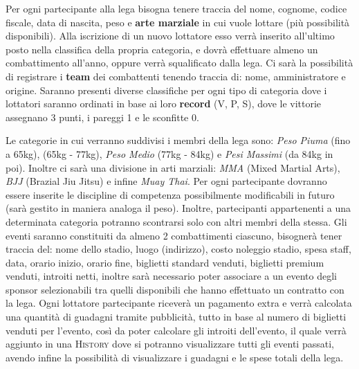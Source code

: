 \documentclass[a4paper,12pt]{report}
\begin{document}
Per ogni partecipante alla lega bisogna tenere traccia del nome, cognome, codice fiscale, data di nascita, peso e \textbf{arte 
marziale} in cui vuole lottare (più possibilità disponibili). Alla iscrizione di un nuovo lottatore esso verrà inserito all'ultimo 
posto nella classifica della propria categoria, e dovrà effettuare almeno un combattimento all'anno, oppure verrà  
squalificato dalla lega. Ci sarà la possibilità di registrare i \textbf{team} dei combattenti tenendo traccia di: nome, amministratore e 
origine. Saranno presenti diverse classifiche per ogni tipo di categoria dove i lottatori saranno ordinati 
in base ai loro \textbf{record} (V, P, S), dove le vittorie assegnano 3 punti, i pareggi 1 e le sconfitte 0.\par
Le categorie in cui verranno suddivisi i membri della lega sono: \textit{Peso Piuma} (fino a 65kg), \textit{} 
(65kg - 77kg), \textit{Peso Medio} (77kg - 84kg) e \textit{Pesi Massimi} (da 84kg in poi). Inoltre ci sarà una divisione in 
arti marziali: \textit{MMA} (Mixed Martial Arts), \textit{BJJ} (Brazial Jiu Jitsu) e infine \textit{Muay Thai}. Per ogni 
partecipante dovranno essere inserite le discipline di competenza possibilmente modificabili in futuro (sarà gestito in maniera 
analoga il peso). Inoltre, partecipanti appartenenti a una determinata categoria potranno scontrarsi solo con altri membri 
della stessa. Gli eventi saranno constituiti da almeno 2 combattimenti ciascuno, bisognerà tener traccia del: nome dello stadio, 
luogo (indirizzo), costo noleggio stadio, spesa staff, data, orario inizio, orario fine, biglietti standard venduti, biglietti 
premium venduti, introiti netti, inoltre sarà necessario poter associare a un evento degli sponsor selezionabili tra quelli disponibili 
che hanno effettuato un contratto con la lega. Ogni lottatore partecipante riceverà un pagamento extra e verrà calcolata una quantità di guadagni 
tramite pubblicità, tutto in base al numero di biglietti venduti per l'evento, così da poter calcolare gli introiti dell'evento, 
il quale verrà aggiunto in una \textsc{History} dove si potranno visualizzare tutti gli eventi passati, 
avendo infine la possibilità di visualizzare i guadagni e le spese totali della lega.
\end{document}
